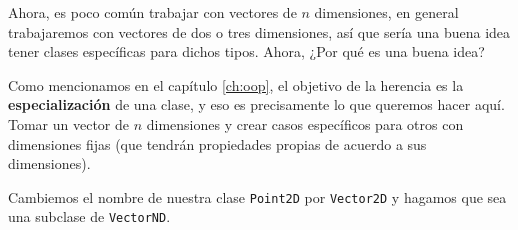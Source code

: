   Ahora, es poco común trabajar con vectores de \(n\) dimensiones, en general trabajaremos
  con vectores de dos o tres dimensiones, así que sería una buena idea tener clases 
  específicas para dichos tipos.
  Ahora, ¿Por qué es una buena idea?

  Como mencionamos en el capítulo \ref{ch:oop}, el objetivo de la herencia es la 
  \textbf{especialización} de una clase, y eso es precisamente lo que queremos hacer aquí.
  Tomar un vector de \(n\) dimensiones y crear casos específicos para otros con 
  dimensiones fijas (que tendrán propiedades propias de acuerdo a sus dimensiones).

  Cambiemos el nombre de nuestra clase \texttt{Point2D} por \texttt{Vector2D} y hagamos 
  que sea una subclase de \texttt{VectorND}.
%